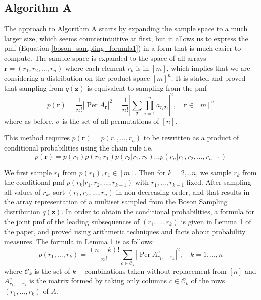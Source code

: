 \documentclass[11pt]{article}
\theoremstyle{theorem}
\theoremstyle{remark}
\theoremstyle{plain}
\theoremstyle{definition}
\DeclareMathOperator*{\Per}{\mathrm{Per}}
\begin{document}
\subsection{Algorithm A}
The approach to Algorithm A starts by expanding the sample space to a much larger size, which seems counterintuitive at first, but it allows us to express the pmf (Equation \ref{boson_sampling_formula1}) in a form that is much easier to compute. The sample space is expanded to the space of all arrays $\mathbf{r}=(r_1, r_2, ... , r_n)$ where each element $r_k$ is in $[m]$, which implies that we are considering a distribution on the product space $[m]^n$. It is stated and proved that sampling from $q(\mathbf{z})$ is equivalent to sampling from the pmf
\begin{equation} \label{eqn:algADistribution}
p(\mathbf{r}) = \frac{1}{n!} \left| \Per A_\mathbf{r} \right| ^2 = \frac{1}{n!} \left| \sum_\sigma \prod_{i=1}^n a_{r_i \sigma_i} \right| ^2 , \quad \mathbf{r} \in [m]^n 
\end{equation}
where as before, $\sigma$ is the set of all permutations of $[n]$.

This method requires $p(\mathbf{r}) = p(r_1, ... , r_n)$ to be rewritten as a product of conditional probabilities using the chain rule i.e.
\begin{equation}\label{eqn:bosonSamplingConditional}
p(\mathbf{r}) = p(r_1)p(r_2 | r_1) p (r_3 | r_1, r_2) ... p(r_n | r_1, r_2, ... , r_{n-1})
\end{equation}

We first sample $r_1$ from $p(r_1), r_1 \in [m]$. Then for $k=2, .. n$, we sample $r_k$ from the conditional pmf $p(r_k | r_1, r_2, ... , r_{k-1})$ with $r_1, ... , r_{k-1}$ fixed. After sampling all values of $r_k$, sort $(r_1, r_2, ... , r_n)$ in non-decreasing order, and that results in the array representation of a multiset sampled from the Boson Sampling distribution $q(\mathbf{z})$. In order to obtain the conditional probabilities, a formula for the joint pmf of the leading subsequences of $(r_1, ... , r_k)$ is given in Lemma 1 of the paper, and proved using arithmetic techniques and facts about probability measures. The formula in Lemma 1 is as follows:
\begin{equation}
p(r_1, ... , r_k) = \frac{(n-k)!}{n!} \sum_{c \in \mathcal{C}_k} \left| \Per A_{r_1, ... , r_k}^c \right| ^2 , \quad k = 1, ... , n
\end{equation}
where $\mathcal{C}_k$ is the set of $k-$combinations taken without replacement from $[n]$ and $A_{r_1, ... , r_k}^c$ is the matrix formed by taking only columns $c \in \mathcal{C}_k$ of the rows $(r_1, ... , r_k)$ of $A$.
\end{document}
